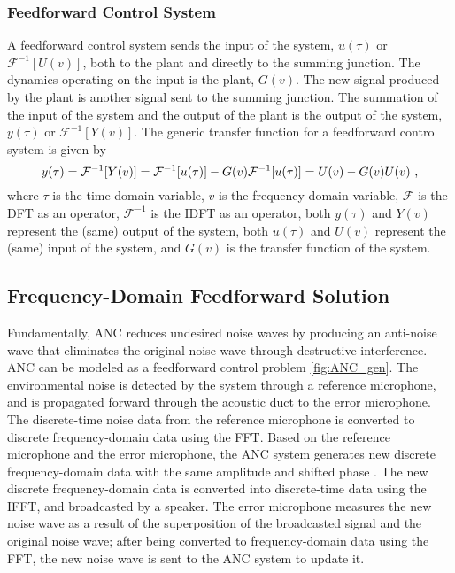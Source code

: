 \documentclass[11pt]{article}
\begin{document}
\subsubsection{Feedforward Control System}

A feedforward control system sends the input of the system, $u(\tau)$ or $\mathcal{F}^{-1}[U(v)]$, both to the plant and directly to the summing junction. The dynamics operating on the input is the plant, $G(v)$. The new signal produced by the plant is another signal sent to the summing junction. The summation of the input of the system and the output of the plant is the output of the system, $y(\tau)$ or $\mathcal{F}^{-1}[Y(v)]$. The generic transfer function for a feedforward control system is given by
\begin{equation}
    y(\tau) = \mathcal{F}^{-1}[Y(v)] = \mathcal{F}^{-1}[u(\tau)] - G(v) \mathcal{F}^{-1}[u(\tau)] = U(v) - G(v) U(v) \text{ ,}
\end{equation}
where $\tau$ is the time-domain variable, $v$ is the frequency-domain variable, $\mathcal{F}$ is the DFT as an operator, $\mathcal{F}^{-1}$ is the IDFT as an operator, both $y(\tau)$ and $Y(v)$ represent the (same) output of the system, both $u(\tau)$ and $U(v)$ represent the (same) input of the system, and $G(v)$ is the transfer function of the system.

\subsection{Frequency-Domain Feedforward Solution}

Fundamentally, ANC reduces undesired noise waves by producing an anti-noise wave that eliminates the original noise wave through destructive interference. ANC can be modeled as a feedforward control problem \cref{fig:ANC_gen}. The environmental noise is detected by the system through a reference microphone, and is propagated forward through the acoustic duct to the error microphone. The discrete-time noise data from the reference microphone is converted to discrete frequency-domain data using the FFT. Based on the reference microphone and the error microphone, the ANC system generates new discrete frequency-domain data with the same amplitude and shifted phase \cite{kajikawa}. The new discrete frequency-domain data is converted into discrete-time data using the IFFT, and broadcasted by a speaker. The error microphone measures the new noise wave as a result of the superposition of the broadcasted signal and the original noise wave; after being converted to frequency-domain data using the FFT, the new noise wave is sent to the ANC system to update it.
\end{document}
